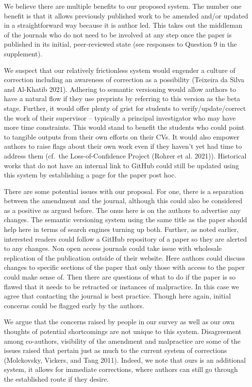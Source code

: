 \documentclass[
]{article}
\begin{document}
We believe there are multiple benefits to our proposed system. The
number one benefit is that it allows previously published work to be
amended and/or updated in a straightforward way because it is author
led. This takes out the middleman of the journals who do not need to be
involved at any step once the paper is published in its initial,
peer-reviewed state (see responses to Question 9 in the supplement).

We suspect that our relatively frictionless system would engender a
culture of correction including an awareness of correction as a
possibility (Teixeira da Silva and Al-Khatib 2021). Adhering to semantic
versioning would allow authors to have a natural flow if they use
preprints by referring to this version as the beta stage. Further, it
would offer plenty of grist for students to verify/update/correct the
work of their supervisor -- typically a principal investigator who may
have more time constraints. This would stand to benefit the students who
could point to tangible outputs from their own efforts on their CVs. It
would also empower authors to raise flags about their own work even if
they haven't yet had time to address them (cf.~the Loss-of-Confidence
Project (Rohrer et al. 2021)). Historical works that do not have an
internal link to GitHub could still be updated using this system by
establishing a page for the paper post hoc.

There are some potential issues with our proposal. For one, there is a
separation between the amendment and the journal, although this could
also be considered as a positive as argued before. The onus here is on
the authors to advertise any changes. The semantic versioning system
using the same title as the paper should help here in terms of search
engines turning up both. Further, as noted earlier, interested readers
could follow a GitHub repository of a paper so they are alerted to any
changes. Non open access journals could take issue with wholesale
replication of the publication outside of their website. Here authors
could discuss changes to specific sections of the paper that only those
with access to the paper could make sense of. Then there are questions
of what to do if the paper is so flawed that it needs to be retracted or
instances of malpractice. In this case we agree that contacting the
journal is best practice. Though here again, initial concerns could be
flagged early by the authors.

We argue that the concerns raised by people in our survey as well as our
own thoughts of potential shortcomings are not unique to this system.
Disagreement among co-authors, visibility of the amendment and
malpractice are some of the issues raised that pertain just as much to
the current system of corrections (Molckovsky, Vickers, and Tang 2011).
Indeed, we note that ours is an additional system, it allows for
immediate corrections, where authors can still go through the
established route if they desire.
\end{document}
